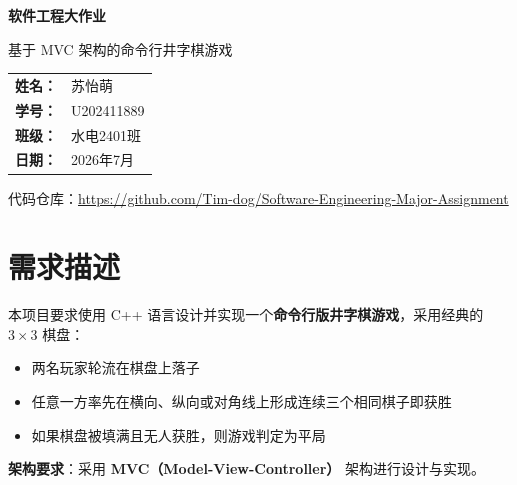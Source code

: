 \documentclass[12pt,a4paper]{ctexart}
\begin{document}
\begin{titlepage}
    \centering
    \vspace*{3cm}
    
    {\Huge\bfseries 软件工程大作业\par}
    \vspace{1cm}
    {\LARGE 基于 MVC 架构的命令行井字棋游戏\par}
    
    \vspace{3cm}
    
    {\large
    \begin{tabular}{rl}
        \textbf{姓名：} & 苏怡萌 \\
        \textbf{学号：} & U202411889 \\
        \textbf{班级：} & 水电2401班 \\
        \textbf{日期：} & 2026年7月 \\
    \end{tabular}
    \par}
    
    \vspace{2cm}
    
    {\normalsize
    代码仓库：\url{https://github.com/Tim-dog/Software-Engineering-Major-Assignment}
    \par}
    
    \vfill
\end{titlepage}

\tableofcontents
\newpage

\section{需求描述}

本项目要求使用 C++ 语言设计并实现一个\textbf{命令行版井字棋游戏}，采用经典的 $3\times 3$ 棋盘：
\begin{itemize}[itemsep=3pt]
    \item 两名玩家轮流在棋盘上落子
    \item 任意一方率先在横向、纵向或对角线上形成连续三个相同棋子即获胜
    \item 如果棋盘被填满且无人获胜，则游戏判定为平局
\end{itemize}

\textbf{架构要求}：采用 \textbf{MVC（Model-View-Controller）} 架构进行设计与实现。
\end{document}
